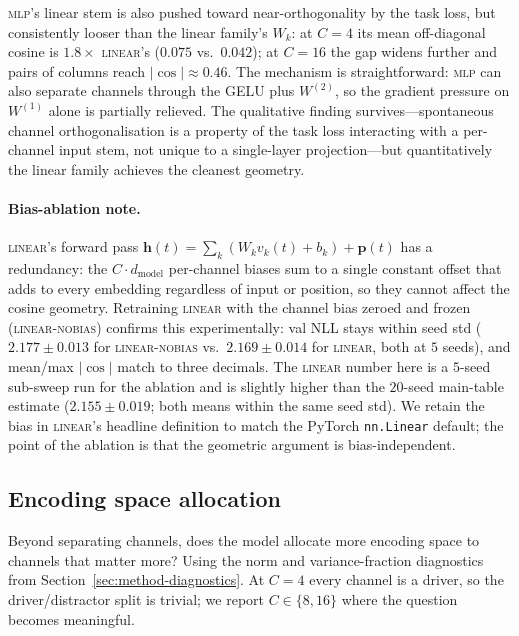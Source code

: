 \documentclass[11pt]{article}
\begin{document}
\textsc{mlp}'s linear stem is also pushed toward near-orthogonality
by the task loss, but consistently looser than the linear family's
$W_k$: at $C{=}4$ its mean off-diagonal cosine is $1.8\times$
\textsc{linear}'s ($0.075$ vs.\ $0.042$); at $C{=}16$ the gap
widens further and pairs of columns reach $|\cos| \approx 0.46$.
The mechanism is straightforward: \textsc{mlp} can also separate
channels through the GELU plus $W^{(2)}$, so the gradient pressure
on $W^{(1)}$ alone is partially relieved. The qualitative finding
survives---spontaneous channel orthogonalisation is a property of
the task loss interacting with a per-channel input stem, not
unique to a single-layer projection---but quantitatively the
linear family achieves the cleanest geometry.

\paragraph{Bias-ablation note.}
\label{sec:results-bias}
\textsc{linear}'s forward pass $\mathbf{h}(t) = \sum_k (W_k v_k(t)
+ b_k) + \mathbf{p}(t)$ has a redundancy: the $C \cdot
d_{\text{model}}$ per-channel biases sum to a single constant
offset that adds to every embedding regardless of input or
position, so they cannot affect the cosine geometry. Retraining
\textsc{linear} with the channel bias zeroed and frozen
(\textsc{linear-nobias}) confirms this experimentally: val NLL
stays within seed std ($2.177 \pm 0.013$ for \textsc{linear-nobias}
vs.\ $2.169 \pm 0.014$ for \textsc{linear}, both at $5$ seeds), and
mean/max $|\cos|$ match to three decimals. The \textsc{linear}
number here is a $5$-seed sub-sweep run for the ablation and is
slightly higher than the $20$-seed main-table estimate
($2.155 \pm 0.019$; both means within the same seed std). We
retain the bias in \textsc{linear}'s headline definition to match
the PyTorch \texttt{nn.Linear} default; the point of the ablation
is that the geometric argument is bias-independent.

\subsection{Encoding space allocation}
\label{sec:results-space}

Beyond separating channels, does the model allocate more encoding
space to channels that matter more? Using the norm and
variance-fraction diagnostics from
Section~\ref{sec:method-diagnostics}. At $C{=}4$ every channel is a
driver, so the driver/distractor split is trivial; we report
$C \in \{8, 16\}$ where the question becomes meaningful.
\end{document}
